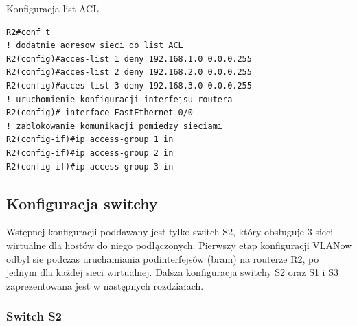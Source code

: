 \documentclass[polish,11pt,a4paper,twoside]{article}
\begin{document}
Konfiguracja list ACL
\begin{lstlisting}
R2#conf t
! dodatnie adresow sieci do list ACL
R2(config)#acces-list 1 deny 192.168.1.0 0.0.0.255
R2(config)#acces-list 2 deny 192.168.2.0 0.0.0.255
R2(config)#acces-list 3 deny 192.168.3.0 0.0.0.255
! uruchomienie konfiguracji interfejsu routera
R2(config)# interface FastEthernet 0/0
! zablokowanie komunikacji pomiedzy sieciami
R2(config-if)#ip access-group 1 in
R2(config-if)#ip access-group 2 in
R2(config-if)#ip access-group 3 in
\end{lstlisting}

\subsection{Konfiguracja switchy}
Wstępnej konfiguracji poddawany jest tylko switch S2, który obsługuje 3 sieci wirtualne dla hostów do niego podłączonych. Pierwszy etap konfiguracji VLANow odbyl sie podczas uruchamiania podinterfejsów (bram) na routerze R2, po jednym dla każdej sieci wirtualnej.
Dalsza konfiguracja switchy S2 oraz S1 i S3 zaprezentowana jest w następnych rozdziałach.

\subsubsection{Switch S2}
\end{document}
